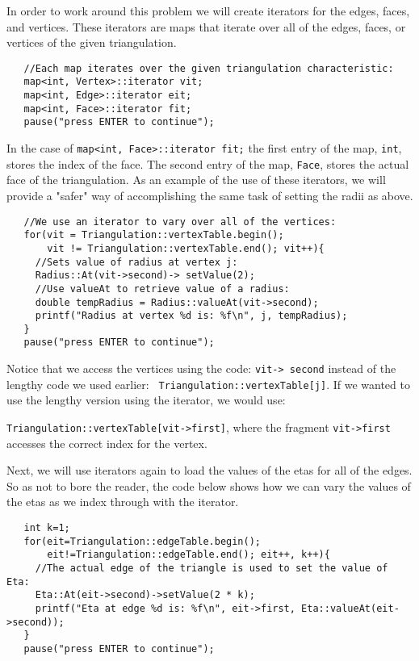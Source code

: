 \documentclass{amsart}
\theoremstyle{plain}
\numberwithin{equation}{section}
\begin{document}
In order to work around this problem we will create iterators for the edges,
faces, and vertices. These iterators are maps that iterate over all of the
edges, faces, or vertices of the given triangulation. \newline
\begin{verbatim}
   //Each map iterates over the given triangulation characteristic:
   map<int, Vertex>::iterator vit;
   map<int, Edge>::iterator eit;
   map<int, Face>::iterator fit;
   pause("press ENTER to continue");
\end{verbatim}

\bigskip

In the case of \verb|map<int, Face>::iterator fit;| the first entry of the
map, \verb|int|, stores the index of the face. The second entry of the map, 
\verb|Face|, stores the actual face of the triangulation. As an example of
the use of these iterators, we will provide a "safer" way of accomplishing
the same task of setting the radii as above.\newline
\begin{verbatim}
   //We use an iterator to vary over all of the vertices:
   for(vit = Triangulation::vertexTable.begin();
       vit != Triangulation::vertexTable.end(); vit++){
     //Sets value of radius at vertex j:
     Radius::At(vit->second)-> setValue(2);
     //Use valueAt to retrieve value of a radius:
     double tempRadius = Radius::valueAt(vit->second);
     printf("Radius at vertex %d is: %f\n", j, tempRadius);
   }
   pause("press ENTER to continue");
\end{verbatim}

\bigskip

Notice that we access the vertices using the code: \texttt{vit->%
second} instead of the lengthy code we used earlier: \texttt{%
Triangulation::vertexTable[j]}. If we wanted to use the lengthy version
using the iterator, we would use:

\texttt{Triangulation::vertexTable[vit->first]}, where the
fragment \texttt{vit->first }accesses the correct index for the
vertex. 

Next, we will use iterators again to load the values of the etas for all of
the edges. So as not to bore the reader, the code below shows how we can
vary the values of the etas as we index through with the iterator. \newline
\begin{verbatim}
   int k=1;
   for(eit=Triangulation::edgeTable.begin();
       eit!=Triangulation::edgeTable.end(); eit++, k++){
     //The actual edge of the triangle is used to set the value of Eta:
     Eta::At(eit->second)->setValue(2 * k);
     printf("Eta at edge %d is: %f\n", eit->first, Eta::valueAt(eit->second));
   }
   pause("press ENTER to continue");
\end{verbatim}
\end{document}
